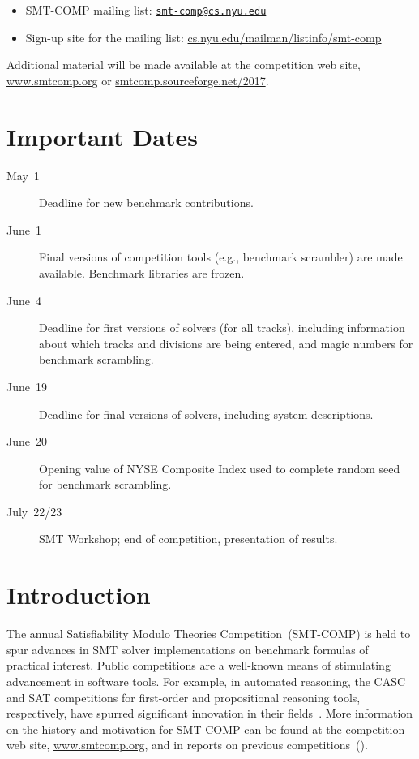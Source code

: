 \documentclass[12pt]{article}
\begin{document}
\begin{itemize}
\item SMT-COMP mailing list:
  \href{mailto:smt-comp@cs.nyu.edu}{\texttt{smt-comp@cs.nyu.edu}}
\item Sign-up site for the mailing list:
  \url{cs.nyu.edu/mailman/listinfo/smt-comp}
\end{itemize}

\noindent Additional material will be made available at the
competition web site, \url{www.smtcomp.org} or
\url{smtcomp.sourceforge.net/2017}.


\newpage

\section{Important Dates}
\label{sec:important}

\begin{description}
\item[May~1] Deadline for new benchmark contributions.
\item[June~1] Final versions of competition tools (e.g., benchmark
  scrambler) are made available.  Benchmark libraries are frozen.
\item[June~4] Deadline for first versions of solvers (for all tracks),
  including information about which tracks and divisions are being
  entered, and magic numbers for benchmark scrambling.
\item[June~19] Deadline for final versions of solvers, including
  system descriptions.
\item[June~20] Opening value of NYSE Composite Index used to complete
  random seed for benchmark scrambling.
\item[July~22/23] SMT Workshop; end of competition, presentation of
  results.
\end{description}


\section{Introduction}

The annual Satisfiability Modulo Theories Competition~(SMT-COMP) is
held to spur advances in SMT solver implementations on benchmark
formulas of practical interest.  Public competitions are a well-known
means of stimulating advancement in software tools.  For example, in
automated reasoning, the CASC and SAT competitions for first-order and
propositional reasoning tools, respectively, have spurred significant
innovation in their fields~\cite{leberre+03,PSS02}.  More information
on the history and motivation for SMT-COMP can be found at the
competition web site, \url{www.smtcomp.org}, and in reports on
previous
competitions~(\cite{SMTCOMP-JAR,SMTCOMP-FMSD,BDOS08,SMTCOMP-2008,CDW14,SMTCOMP-2012,CSW15}).
\end{document}
